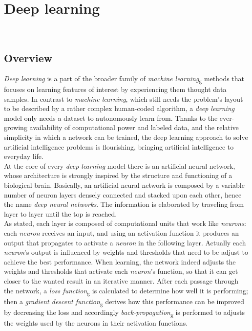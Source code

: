 
\chapter{Deep learning}
\label{cap:deep-learning}

\\

\section{Overview}
	\emph{Deep learning} is a part of the broader family of \emph{\gls{machine learning}}\textsubscript{g} methods that focuses on learning features of interest by experiencing them thought data samples. In contrast to \emph{machine learning}, which still needs the problem's layout to be described by a rather complex human-coded algorithm, a \emph{deep learning} model only needs a dataset to autonomously learn from. Thanks to the ever-growing availability of computational power and labeled data, and the relative simplicity in which a network can be trained, the deep learning approach to solve artificial intelligence problems is flourishing, bringing artificial intelligence to everyday life. \\
	At the core of every \emph{deep learning} model there is an artificial neural network, whose architecture is strongly inspired by the structure and functioning of a biological brain. Basically, an artificial neural network is composed by a variable number of neuron layers densely connected and stacked upon each other, hence the name \emph{deep neural networks}. The information is elaborated by traveling from layer to layer until the top is reached. \\
		As stated, each layer is composed of computational units that work like \emph{neurons}: each \emph{neuron} receives an input, and using an activation function it produces an output that propagates to activate a \emph{neuron} in the following layer. Actually each \emph{neuron}'s output is influenced by weights and thresholds that need to be adjust to achieve the best performance.
	 When learning, the network indeed adjusts the weights and thresholds that activate each \emph{neuron}'s function, so that it can get closer to the wanted result in an iterative manner. After each passage through the network, a \emph{\gls{loss function}}\textsubscript{g} is calculated to determine how well it is performing; then a \emph{\gls{gradient descent function}}\textsubscript{g} derives how this performance can be improved by decreasing the loss and accordingly \emph{\gls{back-propagation}}\textsubscript{g} is performed to adjusts the weights used by the neurons in their activation functions.
	 
